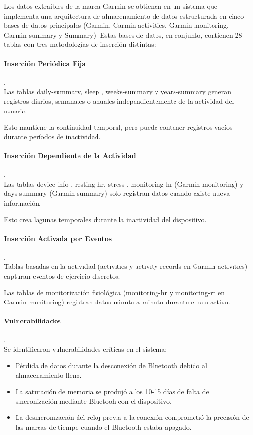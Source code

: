Los datos extraibles de la marca Garmin se obtienen en un sistema que implementa una arquitectura de almacenamiento de datos estructurada en cinco bases de datos principales 
(Garmin, Garmin-activities, Garmin-monitoring, Garmin-summary y Summary).
Estas bases de datos, en conjunto, contienen 28 tablas con tres metodologías de inserción distintas:

\paragraph{Inserción Periódica Fija} . \\
Las tablas daily-summary, sleep , weeks-summary  y years-summary  generan registros diarios, semanales o anuales independientemente de la actividad del usuario.

Esto mantiene la continuidad temporal, pero puede contener registros vacíos durante períodos de inactividad.

\paragraph{Inserción Dependiente de la Actividad} . \\
 Las tablas device-info , resting-hr, stress , monitoring-hr (Garmin-monitoring) y days-summary (Garmin-summary) solo registran datos cuando existe nueva información.
 
 Esto crea lagunas temporales durante la inactividad del dispositivo.

\paragraph{Inserción Activada por Eventos} . \\
 Tablas basadas en la actividad (activities y activity-records en Garmin-activities) capturan eventos de ejercicio discretos. 
 
 Las tablas de monitorización fisiológica (monitoring-hr y monitoring-rr en Garmin-monitoring) registran datos minuto a minuto durante el uso activo.

\paragraph{Vulnerabilidades} . \\
Se identificaron vulnerabilidades críticas en el sistema:

\begin{itemize}
    \item Pérdida de datos durante la desconexión de Bluetooth debido al almacenamiento lleno.
    \item  La saturación de memoria se produjó a los 10-15 días de falta de sincronización mediante Bluetooh con el dispositivo.
    \item La desincronización del reloj previa a la conexión comprometió la precisión de las marcas de tiempo cuando el Bluetooth estaba apagado.
\end{itemize}


